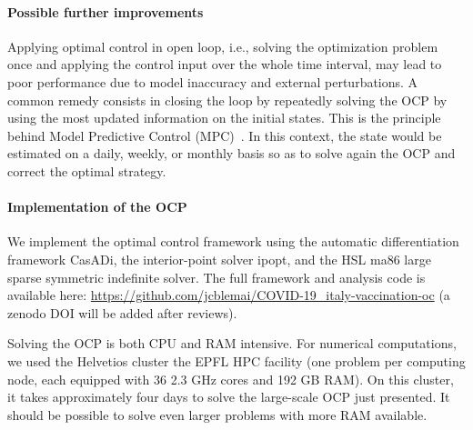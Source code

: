 \paragraph{Possible further improvements} Applying optimal control in open loop, i.e., solving the optimization problem once and applying the control input over the whole time interval, may lead to poor performance due to model inaccuracy and external perturbations. A common remedy consists in closing the loop by repeatedly solving the OCP by using the most updated information on the initial states. This is the principle behind Model Predictive Control (MPC)~\cite{Rawlings:ModelPredictiveControl:2017}. In this context, the state would be estimated on a daily, weekly, or monthly basis so as to solve again the OCP and correct the optimal strategy.

\paragraph{Implementation of the OCP}
We implement the optimal control framework using the automatic differentiation framework CasADi\cite{Andersson:CasADiSymbolicPackage:2012}, the interior-point solver ipopt\cite{Wachter:ImplementationInteriorpointFilter:2006}, and the HSL ma86 large sparse symmetric indefinite solver\cite{HSLCollectionFortran}. The full framework and analysis code is available here: \url{https://github.com/jcblemai/COVID-19_italy-vaccination-oc} (a zenodo DOI will be added after reviews). 

Solving the OCP is both CPU and RAM intensive. For numerical computations, we used the Helvetios cluster the EPFL HPC facility (one problem per computing node, each equipped with 36 2.3 GHz cores and 192 GB RAM). On this cluster, it takes approximately four days to solve the large-scale OCP just presented. It should be possible to solve even larger problems with more RAM available. 

